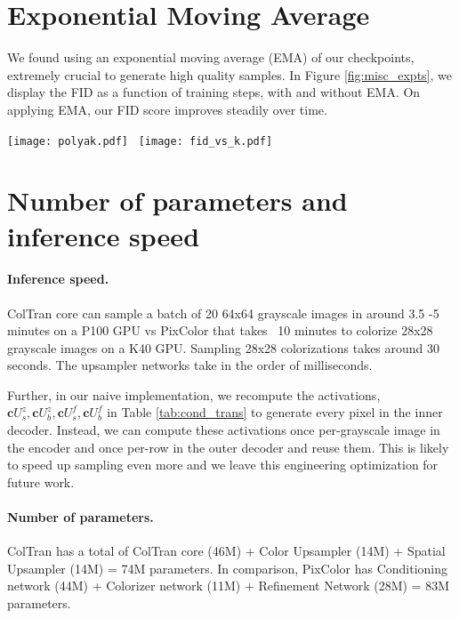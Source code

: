 \documentclass{article} \usepackage{iclr2021_conference,times}
\newcommand{\bb}[1]{\mathbf{#1}}
\newcommand{\bc}{\bb{c}}
\begin{document}
\section{Exponential Moving Average}
\label{fid:ema}
We found using an exponential moving average (EMA) of our checkpoints, extremely crucial to generate high quality samples. In Figure \ref{fig:misc_expts}, we display the FID as a function of training steps, with and without EMA. On applying EMA, our FID score improves steadily over time.


\begin{figure*}
\centering
\texttt{[image: polyak.pdf]} \,
\texttt{[image: fid\_vs\_k.pdf]}
\caption{\textbf{Left}: FID vs training steps, with and without polyak averaging. \textbf{Right}: The effect of K in top-K sampling on FID. See Appendix ~\ref{fid:ema} and ~\ref{fid:topk}}
\label{fig:misc_expts}
\end{figure*}

\section{Number of parameters and inference speed}

\paragraph{Inference speed.} ColTran core can sample a batch of 20 64x64 grayscale images in around 3.5 -5 minutes on a P100 GPU vs PixColor that takes ~10 minutes to colorize 28x28 grayscale images on a K40 GPU. Sampling 28x28 colorizations takes around 30 seconds. The upsampler networks take in the order of milliseconds.

Further, in our naive implementation, we recompute the activations, $\bc U_s^{z}, \bc U_b^{z}, \bc U_s^{f}, \bc U_b^{f}$ in Table \ref{tab:cond_trans} to generate every pixel in the inner decoder. Instead, we can compute these activations once per-grayscale image in the encoder and once per-row in the outer decoder and reuse them. This is likely to speed up sampling even more and we leave this engineering optimization for future work.


\paragraph{Number of parameters.}
ColTran has a total of ColTran core (46M) + Color Upsampler (14M) + Spatial Upsampler (14M) = 74M parameters. In comparison, PixColor has Conditioning network (44M) + Colorizer network (11M) + Refinement Network (28M) = 83M parameters.
\end{document}
